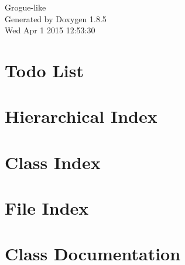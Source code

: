 \documentclass[twoside]{book}
\newcommand{\clearemptydoublepage}{%
  \newpage{\pagestyle{empty}\cleardoublepage}%
}
\begin{document}
\hypersetup{pageanchor=false}
\begin{titlepage}
\vspace*{7cm}
\begin{center}%
{\Large Grogue-\/like }\\
\vspace*{1cm}
{\large Generated by Doxygen 1.8.5}\\
\vspace*{0.5cm}
{\small Wed Apr 1 2015 12:53:30}\\
\end{center}
\end{titlepage}
\clearemptydoublepage
\tableofcontents
\clearemptydoublepage
{}
\hypersetup{pageanchor=true}

\chapter{Todo List}
\label{todo}
\hypertarget{todo}{}

\chapter{Hierarchical Index}

\chapter{Class Index}

\chapter{File Index}

\chapter{Class Documentation}






















\end{document}
